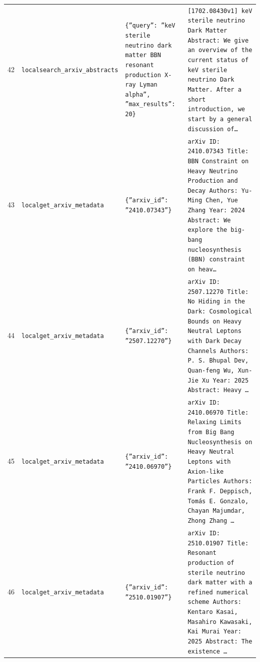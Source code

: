 \documentclass[11pt,a4paper]{article}
\begin{document}
\begin{longtable}{@{}p{}p{}p{}p{}@{}}
42 & \texttt{local}\newline\texttt{search\_\allowbreak{}arxiv\_\allowbreak{}abstracts} & \texttt{\{''query'':\allowbreak{} ''keV sterile neutrino dark matter BBN resonant production X-ray Lyman alpha'',\allowbreak{} ''max\_\allowbreak{}results'':\allowbreak{} 20\}\allowbreak{}} & \texttt{[1702.08430v1]\allowbreak{} keV sterile neutrino Dark Matter Abstract:\allowbreak{} We give an overview of the current status of keV sterile neutrino Dark Matter. After a short introduction,\allowbreak{} we start by a general discussion of\ldots{}\allowbreak{}} \\
43 & \texttt{local}\newline\texttt{get\_\allowbreak{}arxiv\_\allowbreak{}metadata} & \texttt{\{''arxiv\_\allowbreak{}id'':\allowbreak{} ''2410.07343''\}\allowbreak{}} & \texttt{arXiv ID:\allowbreak{} 2410.07343 Title:\allowbreak{} BBN Constraint on Heavy Neutrino Production and Decay Authors:\allowbreak{} Yu-Ming Chen,\allowbreak{} Yue Zhang Year:\allowbreak{} 2024 Abstract:\allowbreak{} We explore the big-bang nucleosynthesis (BBN)\allowbreak{} constraint on heav\ldots{}\allowbreak{}} \\
44 & \texttt{local}\newline\texttt{get\_\allowbreak{}arxiv\_\allowbreak{}metadata} & \texttt{\{''arxiv\_\allowbreak{}id'':\allowbreak{} ''2507.12270''\}\allowbreak{}} & \texttt{arXiv ID:\allowbreak{} 2507.12270 Title:\allowbreak{} No Hiding in the Dark:\allowbreak{} Cosmological Bounds on Heavy Neutral Leptons with Dark Decay Channels Authors:\allowbreak{} P. S. Bhupal Dev,\allowbreak{} Quan-feng Wu,\allowbreak{} Xun-Jie Xu Year:\allowbreak{} 2025 Abstract:\allowbreak{} Heavy \ldots{}\allowbreak{}} \\
45 & \texttt{local}\newline\texttt{get\_\allowbreak{}arxiv\_\allowbreak{}metadata} & \texttt{\{''arxiv\_\allowbreak{}id'':\allowbreak{} ''2410.06970''\}\allowbreak{}} & \texttt{arXiv ID:\allowbreak{} 2410.06970 Title:\allowbreak{} Relaxing Limits from Big Bang Nucleosynthesis on Heavy Neutral Leptons with Axion-like Particles Authors:\allowbreak{} Frank F. Deppisch,\allowbreak{} Tomás E. Gonzalo,\allowbreak{} Chayan Majumdar,\allowbreak{} Zhong Zhang \ldots{}\allowbreak{}} \\
46 & \texttt{local}\newline\texttt{get\_\allowbreak{}arxiv\_\allowbreak{}metadata} & \texttt{\{''arxiv\_\allowbreak{}id'':\allowbreak{} ''2510.01907''\}\allowbreak{}} & \texttt{arXiv ID:\allowbreak{} 2510.01907 Title:\allowbreak{} Resonant production of sterile neutrino dark matter with a refined numerical scheme Authors:\allowbreak{} Kentaro Kasai,\allowbreak{} Masahiro Kawasaki,\allowbreak{} Kai Murai Year:\allowbreak{} 2025 Abstract:\allowbreak{} The existence \ldots{}\allowbreak{}} \\

\end{longtable}
\end{document}
